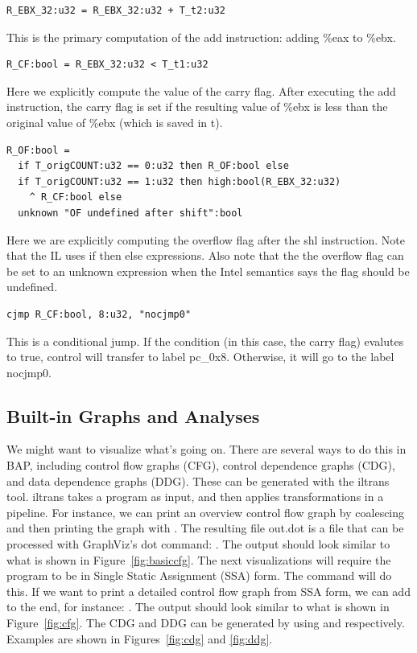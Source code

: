 \begin{verbatim}
R_EBX_32:u32 = R_EBX_32:u32 + T_t2:u32
\end{verbatim}
This is the primary computation of the add instruction: adding \%eax
to \%ebx.

\begin{verbatim}
R_CF:bool = R_EBX_32:u32 < T_t1:u32
\end{verbatim}
Here we explicitly compute the value of the carry flag.  After
executing the add instruction, the carry flag is set if the resulting
value of \%ebx is less than the original value of \%ebx (which is
saved in t).

\begin{verbatim}
R_OF:bool =
  if T_origCOUNT:u32 == 0:u32 then R_OF:bool else
  if T_origCOUNT:u32 == 1:u32 then high:bool(R_EBX_32:u32)
    ^ R_CF:bool else
  unknown "OF undefined after shift":bool
\end{verbatim}
Here we are explicitly computing the overflow flag after the shl
instruction.  Note that the IL uses if then else expressions.  Also
note that the the overflow flag can be set to an unknown expression
when the Intel semantics says the flag should be undefined.

\begin{verbatim}
cjmp R_CF:bool, 8:u32, "nocjmp0"
\end{verbatim}
This is a conditional jump.  If the condition (in this case, the carry
flag) evalutes to true, control will transfer to label pc\_0x8.
Otherwise, it will go to the label nocjmp0.

\subsection{Built-in Graphs and Analyses}

We might want to visualize what's going on.  There are several ways to
do this in BAP, including control flow graphs (CFG), control
dependence graphs (CDG), and data dependence graphs (DDG).  These can
be generated with the iltrans tool.  iltrans takes a program as input,
and then applies transformations in a pipeline.  For instance, we can
print an overview control flow graph by coalescing and then printing
the graph with . The resulting file out.dot is a
file that can be processed with GraphViz's dot command: .  The output should look similar to what
is shown in Figure~\ref{fig:basiccfg}. The next visualizations will
require the program to be in Single Static Assignment (SSA) form.  The
command  will do this.  If we
want to print a detailed control flow graph from SSA form, we can add
 to the end, for instance: . The output should look
similar to what is shown in Figure~\ref{fig:cfg}. The CDG and DDG can
be generated by using  and 
respectively. Examples are shown in Figures~\ref{fig:cdg} and
\ref{fig:ddg}.


